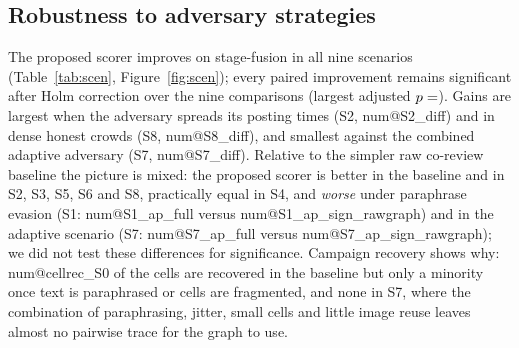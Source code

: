 \documentclass[pdflatex,sn-basic]{sn-jnl}
\makeatletter
\theoremstyle{thmstyleone}
\theoremstyle{thmstylethree}
\newcommand{\num}[1]{\csname num@#1\endcsname}
\makeatother
\begin{document}
\subsection{Robustness to adversary strategies}\label{sec:res_scen}
The proposed scorer improves on stage-fusion in all nine scenarios (Table~\ref{tab:scen}, Figure~\ref{fig:scen}); every paired improvement remains significant after Holm correction over the nine comparisons (largest adjusted $p=\num{holmmax}$). Gains are largest when the adversary spreads its posting times (S2, \num{S2_diff}) and in dense honest crowds (S8, \num{S8_diff}), and smallest against the combined adaptive adversary (S7, \num{S7_diff}). Relative to the simpler raw co-review baseline the picture is mixed: the proposed scorer is better in the baseline and in S2, S3, S5, S6 and S8, practically equal in S4, and \emph{worse} under paraphrase evasion (S1: \num{S1_ap_full} versus \num{S1_ap_sign_rawgraph}) and in the adaptive scenario (S7: \num{S7_ap_full} versus \num{S7_ap_sign_rawgraph}); we did not test these differences for significance. Campaign recovery shows why: \num{cellrec_S0} of the cells are recovered in the baseline but only a minority once text is paraphrased or cells are fragmented, and none in S7, where the combination of paraphrasing, jitter, small cells and little image reuse leaves almost no pairwise trace for the graph to use.
\end{document}
